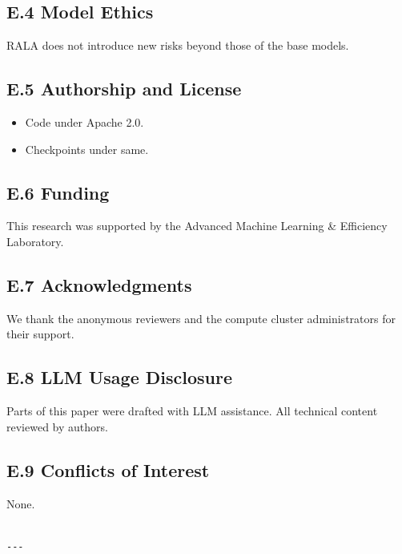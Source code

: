 \subsection{E.4 Model Ethics}

RALA does not introduce new risks beyond those of the base models.

\subsection{E.5 Authorship and License}

\begin{itemize}
\item Code under Apache 2.0.
\item Checkpoints under same.

\end{itemize}
\subsection{E.6 Funding}

This research was supported by the Advanced Machine Learning \& Efficiency Laboratory.

\subsection{E.7 Acknowledgments}

We thank the anonymous reviewers and the compute cluster administrators for their support.

\subsection{E.8 LLM Usage Disclosure}

Parts of this paper were drafted with LLM assistance. All technical content 
reviewed by authors.

\subsection{E.9 Conflicts of Interest}

None.
\begin{lstlisting}

---
\end{lstlisting}